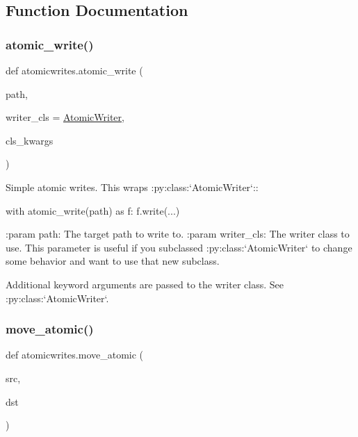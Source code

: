 \subsection{Function Documentation}
\mbox{\label{namespaceatomicwrites_a019d5cceda829d130599a1c7343e2000}} 
\subsubsection{\texorpdfstring{atomic\+\_\+write()}{atomic\_write()}}
{\footnotesize\ttfamily def atomicwrites.\+atomic\+\_\+write (\begin{DoxyParamCaption}\item[{}]{path,  }\item[{}]{writer\+\_\+cls = {\ttfamily \hyperlink{classatomicwrites_1_1_atomic_writer}{Atomic\+Writer}},  }\item[{}]{cls\+\_\+kwargs }\end{DoxyParamCaption})}

\begin{DoxyVerb}Simple atomic writes. This wraps :py:class:`AtomicWriter`::

    with atomic_write(path) as f:
        f.write(...)

:param path: The target path to write to.
:param writer_cls: The writer class to use. This parameter is useful if you
    subclassed :py:class:`AtomicWriter` to change some behavior and want to
    use that new subclass.

Additional keyword arguments are passed to the writer class. See
:py:class:`AtomicWriter`.
\end{DoxyVerb}
 \mbox{\label{namespaceatomicwrites_a9119d986230aa83ba3faf3b0f1dd7824}} 
\subsubsection{\texorpdfstring{move\+\_\+atomic()}{move\_atomic()}}
{\footnotesize\ttfamily def atomicwrites.\+move\+\_\+atomic (\begin{DoxyParamCaption}\item[{}]{src,  }\item[{}]{dst }\end{DoxyParamCaption})}

